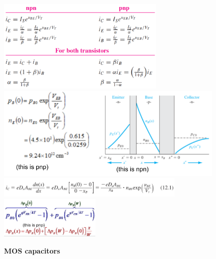 \documentclass{article}
\begin{document}
\begin{center}
    \includegraphics[align=c, height=4.5cm]{bjtcurrents.png}
    \includegraphics[align=c, height=4.5cm]{bjtcurrenteqs.png}
    \includegraphics[align=c, height=1cm]{bjtic.png}
    \includegraphics[align=c, height=2cm]{bjtbaseapprox.png}
\end{center}
\textbf{MOS capacitors}
\end{document}
